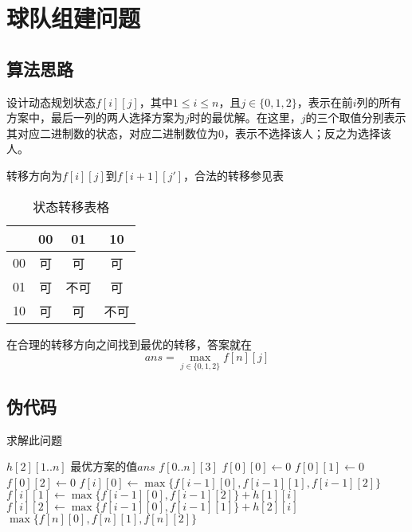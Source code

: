 \documentclass[UTF8]{ctexart}
\begin{document}
\section{球队组建问题} %
    \subsection*{算法思路}
        设计动态规划状态$f[i][j]$，其中$1\leq i \leq n$，且$j \in \{0, 1, 2\}$，表示在前$i$列的所有方案中，最后一列的两人选择方案为$j$时的最优解。在这里，$j$的三个取值分别表示其对应二进制数的状态，对应二进制数位为0，表示不选择该人；反之为选择该人。

        转移方向为$f[i][j]$到$f[i+1][j']$，合法的转移参见表
        \begin{table}
            \centering
            \caption{状态转移表格}
            \label{table1}
            \begin{tabular}{|c|c|c|c|}
                & 00 & 01 & 10 \\
                \hline
                00 & 可 & 可 & 可 \\
                \hline
                01 & 可 & 不可 & 可 \\
                \hline
                10 & 可 & 可 & 不可 \\
                \hline
            \end{tabular}
        \end{table}

        在合理的转移方向之间找到最优的转移，答案就在
        $$ans = \max_{j\in\{0, 1, 2\}}{f[n][j]}$$

    \subsection*{伪代码}
        \begin{algorithm}
            \caption{求解此问题}
            \begin{algorithmic}[1]
                \Require $h[2][1..n]$
                \Ensure 最优方案的值$ans$
                    \State $f[0..n][3]$
                    \State $f[0][0] \gets 0$
                    \State $f[0][1] \gets 0$
                    \State $f[0][2] \gets 0$
                        \State $f[i][0] \gets \max{\{f[i-1][0], f[i-1][1], f[i-1][2]\}}$
                        \State $f[i][1] \gets \max{\{f[i-1][0], f[i-1][2]\}} + h[1][i]$
                        \State $f[i][2] \gets \max{\{f[i-1][0], f[i-1][1]\}} + h[2][i]$
                    \EndFor
                    \State \Return $\max{\{f[n][0], f[n][1], f[n][2]\}}$
                \EndFunction
            \end{algorithmic}
            \label{algo2}
        \end{algorithm}
\end{document}
